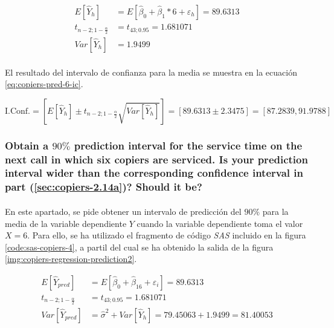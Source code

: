 \documentclass{article}
\begin{document}
        \begin{align}
          E[\widehat{Y}_h] &= E[\widehat{\beta}_0 +\widehat{\beta}_1 * 6 + \varepsilon_h] = 89.6313\\
          t_{n-2;1-\frac{\alpha}{2}} &= t_{43;0.95} = 1.681071\\
          Var\left[\widehat{Y}_h \right]  &= 1.9499
        \end{align}

        \paragraph{}
        El resultado del intervalo de confianza para la media se muestra en la ecuación \eqref{eq:copiers-pred-6-ic}.

        \begin{equation}
        \label{eq:copiers-pred-6-ic}
          \text{I.Conf.}
          = \left[E[\widehat{Y}_h] \pm t_{n-2;1-\frac{\alpha}{2}}\sqrt{Var\left[\widehat{Y}_h \right]}\right]
          = \left[89.6313 \pm 2.3475\right]
          = \left[87.2839, 91.9788\right]
        \end{equation}

      \subsubsection{Obtain a $90\%$ prediction interval for the service time on the next call in which six copiers are serviced. Is your prediction interval wider than the corresponding confidence interval in part (\ref{sec:copiers-2.14a})? Should it be?}

        \paragraph{}
        En este apartado, se pide obtener un intervalo de predicción del $90\%$ para la media de la variable dependiente $Y$ cuando la variable dependiente toma el valor $X=6$. Para ello, se ha utilizado el fragmento de código \emph{SAS} incluido en la figura \ref{code:sas-copiers-4}, a partil del cual se ha obtenido la salida de la figura \ref{img:copiers-regression-prediction2}.

        \begin{align}
          E[\widehat{Y}_{pred}] &= E[\widehat{\beta}_0 +\widehat{\beta}_16 + \varepsilon_i] = 89.6313\\
          t_{n-2;1-\frac{\alpha}{2}} &= t_{43;0.95} = 1.681071\\
          Var\left[\widehat{Y}_{pred}\right] &= \widehat{\sigma}^2 + Var\left[\widehat{Y}_h \right]  =79.45063 + 1.9499 = 81.40053
        \end{align}
\end{document}
